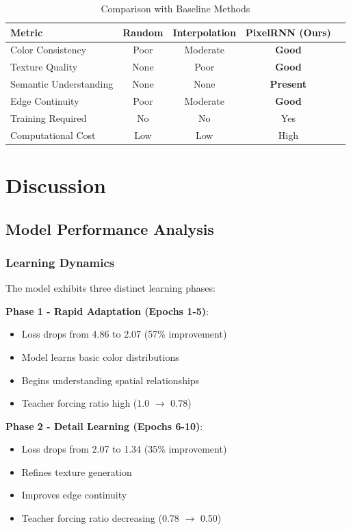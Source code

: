 \documentclass[12pt,a4paper]{article}
\begin{document}
\begin{table}[H]
\centering
\caption{Comparison with Baseline Methods}
\begin{tabular}{@{}lcccc@{}}
\toprule
\textbf{Metric} & \textbf{Random} & \textbf{Interpolation} & \textbf{PixelRNN (Ours)} \\ \midrule
Color Consistency & Poor & Moderate & \textbf{Good} \\
Texture Quality & None & Poor & \textbf{Good} \\
Semantic Understanding & None & None & \textbf{Present} \\
Edge Continuity & Poor & Moderate & \textbf{Good} \\
Training Required & No & No & Yes \\
Computational Cost & Low & Low & High \\ \bottomrule
\end{tabular}
\end{table}

\section{Discussion}

\subsection{Model Performance Analysis}

\subsubsection{Learning Dynamics}

The model exhibits three distinct learning phases:

\textbf{Phase 1 - Rapid Adaptation (Epochs 1-5)}:
\begin{itemize}
    \item Loss drops from 4.86 to 2.07 (57\% improvement)
    \item Model learns basic color distributions
    \item Begins understanding spatial relationships
    \item Teacher forcing ratio high (1.0 $\rightarrow$ 0.78)
\end{itemize}

\textbf{Phase 2 - Detail Learning (Epochs 6-10)}:
\begin{itemize}
    \item Loss drops from 2.07 to 1.34 (35\% improvement)
    \item Refines texture generation
    \item Improves edge continuity
    \item Teacher forcing ratio decreasing (0.78 $\rightarrow$ 0.50)
\end{itemize}
\end{document}
